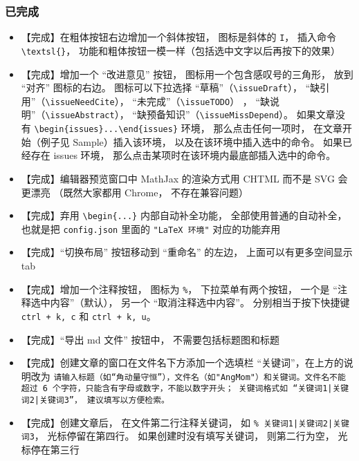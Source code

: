 \subsubsection{已完成}
\begin{itemize}
\item 【完成】在粗体按钮右边增加一个斜体按钮， 图标是斜体的 \verb`I`， 插入命令 \verb`\textsl{}`， 功能和粗体按钮一模一样（包括选中文字以后再按下的效果）

\item 【完成】增加一个 “改进意见” 按钮， 图标用一个包含感叹号的三角形， 放到 “对齐” 图标的右边。 图标可以下拉选择 “草稿”（\verb`\issueDraft`）， “缺引用”（\verb`\issueNeedCite`）， “未完成”（\verb`\issueTODO`） ， “缺说明”（\verb`\issueAbstract`）， “缺预备知识”（\verb`\issueMissDepend`）。 如果文章没有 \verb`\begin{issues}...\end{issues}` 环境， 那么点击任何一项时， 在文章开始（例子见 Sample）插入该环境， 以及在该环境中插入选中的命令。 如果已经存在 issues 环境， 那么点击某项时在该环境内最底部插入选中的命令。

\item 【完成】编辑器预览窗口中 MathJax 的渲染方式用 CHTML 而不是 SVG 会更漂亮 （既然大家都用 Chrome， 不存在兼容问题）

\item 【完成】弃用 \verb`\begin{...}` 内部自动补全功能， 全部使用普通的自动补全， 也就是把 \verb`config.json` 里面的 \verb`"LaTeX 环境"` 对应的功能弃用

\item 【完成】“切换布局” 按钮移动到 “重命名” 的左边， 上面可以有更多空间显示 tab

\item 【完成】增加一个注释按钮， 图标为 \verb`%`， 下拉菜单有两个按钮， 一个是 “注释选中内容”（默认）， 另一个 “取消注释选中内容”。 分别相当于按下快捷键 \verb`ctrl + k, c` 和 \verb`ctrl + k, u`。

\item 【完成】“导出 md 文件” 按钮中， 不需要包括标题图和标题

\item 【完成】创建文章的窗口在文件名下方添加一个选填栏 “关键词”，在上方的说明改为 \lstinline+请输入标题（如“角动量守恒”），文件名（如"AngMom"）和关键词。文件名不能超过 6 个字符，只能含有字母或数字，不能以数字开头； 关键词格式如 “关键词1|关键词2|关键词3”， 建议填写以方便检索。+

\item 【完成】创建文章后， 在文件第二行注释关键词， 如 \lstinline+% 关键词1|关键词2|关键词3+， 光标停留在第四行。 如果创建时没有填写关键词， 则第二行为空， 光标停在第三行


\end{itemize}
